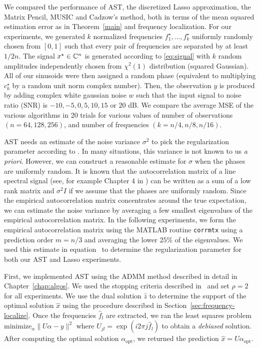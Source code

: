 We compared the performance of AST, the discretized Lasso approximation, the
Matrix Pencil, MUSIC and Cadzow's method, both in terms of the mean squared
estimation error as in Theorem~\ref{main} and frequency localization. For our
experiments, we generated $k$ normalized frequencies $f_1^\star, \ldots,
f_k^\star$ uniformly randomly chosen from $\left[0,1\right]$ such that every
pair of frequencies are separated by at least $1/2n$. The signal $x^\star \in
\mathbb{C}^n$ is generated according to \eqref{eq:signal} with $k$ random amplitudes
independently chosen from $\chi^2(1)$ distribution (squared Gaussian). All of
our sinusoids were then assigned a random phase (equivalent to multiplying
$c_k^\star$ by a random unit norm complex number). Then, the observation $y$ is
produced by adding complex white gaussian noise $w$ such that the input signal
to noise ratio (SNR) is $-10,-5,0,5,10,15$ or $20$ dB. We compare the average
MSE of the various algorithms in 20 trials for various values of number of
observations $(n = 64,128,256)$, and number of frequencies $ (k =
n/4,n/8,n/16)$.


AST needs an estimate of the noise variance $\sigma^2$ to pick the
regularization parameter according to . In many situations, this
variance is not known to us \emph{a priori}. However, we can construct a
reasonable estimate for $\sigma$ when the phases are uniformly random. It is
known that the autocorrelation matrix of a line spectral signal (see, for
example Chapter 4 in \cite{StoicaMoses}) can be written as a sum of a low rank
matrix and $\sigma^2 I$ if we assume that the phases are uniformly random. Since
the empirical autocorrelation matrix concentrates around the true expectation,
we can estimate the noise variance by averaging a few smallest eigenvalues of
the empirical autocorrelation matrix. In the following experiments, we form the
empirical autocorrelation matrix using the MATLAB routine \texttt{corrmtx} using
a prediction order $m=n/3$ and averaging the lower $25\%$ of the eigenvalues. We
used this estimate in equation~ to determine the regularization
parameter for both our AST and Lasso experiments.

First, we implemented AST using the ADMM method described in detail in
Chapter~\ref{chap:algos}. We used the stopping criteria described
in~\cite{admm2011} and set $\rho=2$ for all experiments. We use the dual
solution $\hat{z}$ to determine the support of the optimal solution $\hat{x}$
using the procedure described in Section~\ref{sec:frequency-localize}. Once the
frequencies $\hat{f}_l$ are extracted, we ran the least squares problem
$\mbox{minimize}_\alpha \|U \alpha - y\|^2$ where $U_{jl} = \exp(i 2\pi j
\hat{f}_l)$ to obtain a \emph{debiased} solution. After computing the optimal
solution $\alpha_{\mathrm{opt}}$, we returned the prediction $\hat{x} =
U\alpha_{\mathrm{opt}}$.

